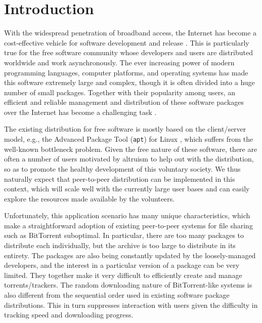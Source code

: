 \documentclass[conference]{IEEEtran}
\begin{document}

\section{Introduction}
\label{intro}

With the widespread penetration of broadband access, the Internet has become a cost-effective
vehicle for software development and release \cite{feller2000fao}. This is particularly true for the free software
community whose developers and users are distributed worldwide and work asynchronously. The ever increasing power of
modern programming languages, computer platforms, and operating systems has made this software extremely large and complex,
though it is often divided into a huge number of small packages.
Together with their popularity among users,
an efficient and reliable management and distribution of these software packages over the Internet has become a challenging task \cite{ubuntu-blueprint}.

The existing distribution for free software is mostly based on the client/server model, e.g.,
the Advanced Package Tool (\texttt{apt}) for Linux \cite{apt}, which suffers from the well-known bottleneck problem.
Given the free nature of these software, there are often a number of users
motivated by altruism to help out with the distribution, so as to promote the healthy development
of this voluntary society.
We thus naturally expect that peer-to-peer distribution can be implemented in
this context, which will scale well with the currently large user bases and can easily explore the resources made available by
the volunteers.

Unfortunately, this application scenario has many unique characteristics, which
make a straightforward adoption of existing peer-to-peer systems for file sharing such as BitTorrent suboptimal. In particular,
there are too many packages to distribute each individually, but the archive is
too large to distribute in its entirety. The packages are also being constantly
updated by the loosely-managed developers, and the interest in a particular version of a package can be very
limited. They together make it very difficult to efficiently create and manage torrents/trackers. The random downloading nature of BitTorrent-like systems is also different from the
sequential order used in existing software package distributions. This in turn suppresses interaction with users
given the difficulty in tracking speed and downloading progress.
\end{document}
